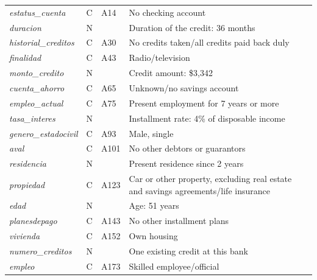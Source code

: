 {\begin{table}[H]
\begin{tabularx}{\textwidth}{
			>{\raggedright\arraybackslash}p{}
			>{\centering\arraybackslash}p{}
			>{\centering\arraybackslash}p{}
			X
		}
		\textit{estatus\_cuenta} 
		& C 
		& A14 
		& No checking account \\
		
		\textit{duracion} 
		& N 
		& 36 
		& Duration of the credit: 36 months \\
		
		\textit{historial\_creditos} 
		& C 
		& A30 
		& No credits taken/all credits paid back duly \\
		
		\textit{finalidad} 
		& C 
		& A43 
		& Radio/television \\
		
		\textit{monto\_credito} 
		& N 
		& 3342 
		& Credit amount: \$3,342 \\
		
		\textit{cuenta\_ahorro} 
		& C 
		& A65 
		& Unknown/no savings account \\
		
		\textit{empleo\_actual} 
		& C 
		& A75 
		& Present employment for 7 years or more \\
		
		\textit{tasa\_interes} 
		& N 
		& 4 
		& Installment rate: 4\% of disposable income \\
		
		\textit{genero\_estadocivil} 
		& C 
		& A93 
		& Male, single \\
		
		\textit{aval} 
		& C 
		& A101 
		& No other debtors or guarantors \\
		
		\textit{residencia} 
		& N 
		& 2 
		& Present residence since 2 years \\
		
		\textit{propiedad} 
		& C 
		& A123 
		& Car or other property, excluding real estate and savings agreements/life insurance \\
		
		\textit{edad} 
		& N 
		& 51 
		& Age: 51 years \\
		
		\textit{planesdepago} 
		& C 
		& A143 
		& No other installment plans \\
		
		\textit{vivienda} 
		& C 
		& A152 
		& Own housing \\
		
		\textit{numero\_creditos} 
		& N 
		& 1 
		& One existing credit at this bank \\
		
		\textit{empleo} 
		& C 
		& A173 
		& Skilled employee/official \\
		

\end{tabularx}
\end{table}}
